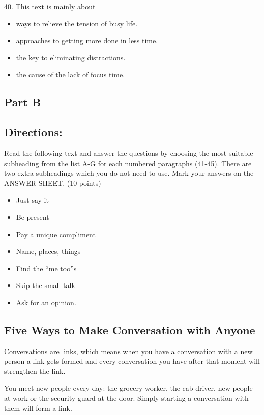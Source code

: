 \documentclass[UTF8,11pt]{ctexart}
\begin{document}
40. This text is mainly about \_\_\_\_


\begin{itemize}[leftmargin=2em,itemsep=.2em,topsep=.4em]\item[A.] ways to relieve the tension of busy life.
\item[B.] approaches to getting more done in less time.
\item[C.] the key to eliminating distractions.
\item[D.] the cause of the lack of focus time.
\end{itemize}

\subsection*{\textbf{Part B}}


\subsection*{\textbf{Directions:}}


Read the following text and answer the questions by choosing the most suitable subheading from the list A-G for each numbered paragraphs (41-45). There are two extra subheadings which you do not need to use. Mark your answers on the ANSWER SHEET. (10 points)


\begin{itemize}[leftmargin=2em,itemsep=.2em,topsep=.4em]\item[A.] Just say it
\item[B.] Be present
\item[C.] Pay a unique compliment
\item[D.] Name, places, things
\item[E.] Find the “me too”s
\item[F.] Skip the small talk
\item[G.] Ask for an opinion.
\end{itemize}

\subsection*{\textbf{Five Ways to Make Conversation with Anyone}}


Conversations are links, which means when you have a conversation with a new person a link gets formed and every conversation you have after that moment will strengthen the link.


You meet new people every day: the grocery worker, the cab driver, new people at work or the security guard at the door. Simply starting a conversation with them will form a link.
\end{document}
